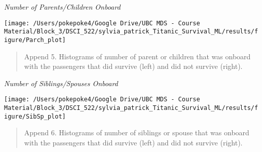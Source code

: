 \documentclass[]{article}
\begin{document}
\newpage

\emph{Number of Parents/Children Onboard}

\begin{center}\texttt{[image: /Users/pokepoke4/Google Drive/UBC MDS - Course Material/Block\_3/DSCI\_522/sylvia\_patrick\_Titanic\_Survival\_ML/results/figure/Parch\_plot]} \end{center}

\begin{quote}
Append 5. Histograms of number of parent or children that was onboard
with the passengers that did survive (left) and did not survive (right).
\end{quote}

\newpage

\emph{Number of Siblings/Spouses Onboard}

\begin{center}\texttt{[image: /Users/pokepoke4/Google Drive/UBC MDS - Course Material/Block\_3/DSCI\_522/sylvia\_patrick\_Titanic\_Survival\_ML/results/figure/SibSp\_plot]} \end{center}

\begin{quote}
Append 6. Histograms of number of siblings or spouse that was onboard
with the passengers that did survive (left) and did not survive (right).
\end{quote}
\end{document}
